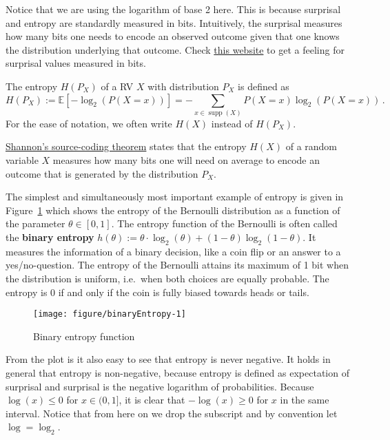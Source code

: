 \documentclass[11pt,leqno,a4paper]{report}\usepackage[]{graphicx}\usepackage[]{color}
\makeatletter
\def\maxwidth{ %
  \ifdim\Gin@nat@width>\linewidth
    \linewidth
  \else
    \Gin@nat@width
  \fi
}
\newenvironment{knitrout}{}{} %
\newcommand{\supp}{\operatorname{supp}}
\newcommand{\E}{\mathbb{E}}
\makeatother
\begin{document}
Notice that we are using the logarithm of base 2 here. This is because surprisal and entropy are standardly measured in bits. Intuitively, the surprisal measures how many bits one needs to encode an observed outcome given that one knows the distribution underlying that outcome. Check \href{http://www.umsl.edu/~fraundorfp/egsurpriNOLOGS.html}{this website} to get a feeling for surprisal values measured in bits.

\begin{Definition}[Entropy]
The entropy $H(P_X)$ of a RV $ X $ with distribution $P_X$ is defined as 
$$H(P_X) := \E[-\log_{2}(P(X=x))] = - \!\! \sum_{x \in \supp(X)} P(X=x) \log_2(P(X=x)) \, .$$ 
For the ease of notation, we often write $H(X)$ instead of $H(P_X)$.
\end{Definition}

\href{https://en.wikipedia.org/wiki/Shannon%27s_source_coding_theorem}{Shannon's source-coding theorem} states that the entropy $H(X)$ of a random variable $X$ measures how many bits one will need on average to encode an outcome that is generated by the distribution $ P_{X} $.

The simplest and simultaneously most important example of entropy is given in Figure~\ref{fig:binaryEntropy} which shows the entropy of the Bernoulli distribution as a function of the parameter $ \theta \in [0,1]$. The entropy function of the Bernoulli is often called the \textbf{binary entropy} $h(\theta) := \theta \cdot \log_2(\theta) + (1-\theta) \log_2(1-\theta)$. It measures the information of a binary decision, like a coin flip or an answer to a yes/no-question.
The entropy of the Bernoulli attains its maximum of 1 bit when the distribution is uniform, i.e.\ when both choices are equally 
probable. The entropy is 0 if and only if the coin is fully biased towards heads or tails.

\begin{knitrout}
\color{fgcolor}\begin{figure}[t!]

{\centering \texttt{[image: figure/binaryEntropy-1]} 

}

\caption[Binary entropy function]{Binary entropy function}\label{fig:binaryEntropy}
\end{figure}


\end{knitrout}

From the plot is it also easy to see that entropy is never negative. It holds in general that entropy is non-negative,
because entropy is defined as expectation of surprisal and surprisal is the negative logarithm of probabilities. 
Because $ \log(x) \leq 0 $ for $ x \in (0,1] $, it is clear that $ -\log(x) \geq 0 $ for $ x $ in the same
interval. Notice that from here on we drop the subscript and by convention let $ \log = \log_{2} $.
\end{document}
